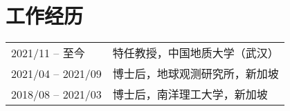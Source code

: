 \section*{工作经历}
\begin{tabular}{p{} p{}}
2021/11 -- 至今 & 特任教授，中国地质大学（武汉） \\
2021/04 -- 2021/09 & 博士后，地球观测研究所，新加坡 \\
2018/08 -- 2021/03 & 博士后，南洋理工大学，新加坡 \\
\end{tabular}
